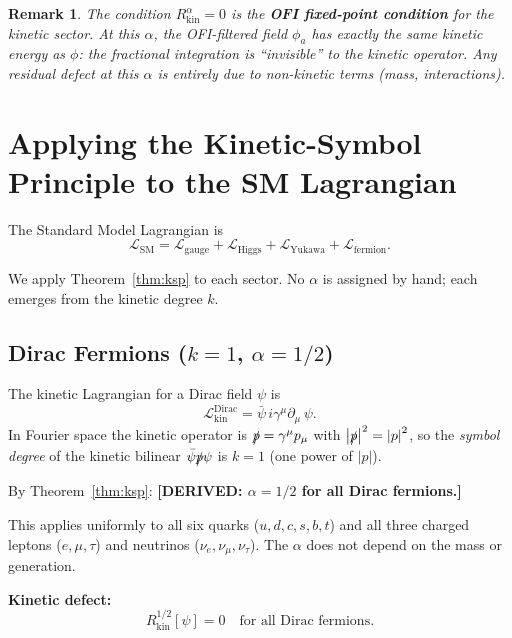 \documentclass[12pt]{article}
\newtheorem{remark}[theorem]{Remark}
\theoremstyle{definition}
\newcommand{\abs}[1]{\left|#1\right|}
\newcommand{\DERIVED}[1]{\textcolor{derivedcolor}{\textbf{[DERIVED: #1]}}}
\begin{document}
\begin{remark}
The condition $R^\alpha_{\mathrm{kin}} = 0$ is the \textbf{OFI fixed-point
condition} for the kinetic sector.  At this $\alpha$, the OFI-filtered field
$\phi_a$ has exactly the same kinetic energy as $\phi$: the fractional
integration is ``invisible'' to the kinetic operator.  Any residual defect
at this $\alpha$ is entirely due to non-kinetic terms (mass, interactions).
\end{remark}

\section{Applying the Kinetic-Symbol Principle to the SM Lagrangian}
\label{sec:sm}

The Standard Model Lagrangian is
\begin{equation}
  \mathcal{L}_{\mathrm{SM}}
  = \mathcal{L}_{\mathrm{gauge}}
  + \mathcal{L}_{\mathrm{Higgs}}
  + \mathcal{L}_{\mathrm{Yukawa}}
  + \mathcal{L}_{\mathrm{fermion}}.
\end{equation}

We apply Theorem~\ref{thm:ksp} to each sector.  No $\alpha$ is assigned
by hand; each emerges from the kinetic degree $k$.

\subsection{Dirac Fermions ($k=1$, $\alpha=1/2$)}

The kinetic Lagrangian for a Dirac field $\psi$ is
\begin{equation}
  \mathcal{L}_{\mathrm{kin}}^{\mathrm{Dirac}}
  = \bar\psi\, i\gamma^\mu\partial_\mu\, \psi.
\end{equation}
In Fourier space the kinetic operator is $\slashed{p} = \gamma^\mu p_\mu$
with $\abs{\slashed{p}}^2 = \abs{p}^2$, so the \emph{symbol degree} of the
kinetic bilinear $\bar\psi \slashed{p} \psi$ is $k=1$ (one power of $\abs{p}$).

By Theorem~\ref{thm:ksp}: \DERIVED{$\alpha = 1/2$ for all Dirac fermions.}

This applies uniformly to all six quarks ($u,d,c,s,b,t$) and all three
charged leptons ($e,\mu,\tau$) and neutrinos ($\nu_e,\nu_\mu,\nu_\tau$).
The $\alpha$ does not depend on the mass or generation.

\textbf{Kinetic defect:}
\begin{equation}
  R^{1/2}_{\mathrm{kin}}[\psi] = 0
  \quad \text{for all Dirac fermions.}
\end{equation}
\end{document}
